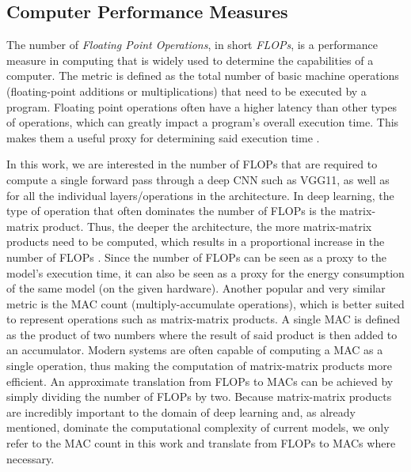 \subsection{Computer Performance Measures}
\label{sec:appendix-performance-measures}
The number of \emph{Floating Point Operations}, in short \emph{FLOPs}, is a performance measure in computing that is widely used to determine the capabilities of a computer. The metric is defined as the total number of basic machine operations (floating-point additions or multiplications) that need to be executed by a program. Floating point operations often have a higher latency than other types of operations, which can greatly impact a program's overall execution time. This makes them a useful proxy for determining said execution time \citep{Dissecting_DBLP:journals/corr/abs-2107-11949}.

In this work, we are interested in the number of FLOPs that are required to compute a single forward pass through a deep CNN such as VGG11, as well as for all the individual layers/operations in the architecture. In deep learning, the type of operation that often dominates the number of FLOPs is the matrix-matrix product. Thus, the deeper the architecture, the more matrix-matrix products need to be computed, which results in a proportional increase in the number of FLOPs \citep{Dissecting_DBLP:journals/corr/abs-2107-11949}. Since the number of FLOPs can be seen as a proxy to the model's execution time, it can also be seen as a proxy for the energy consumption of the same model (on the given hardware)\citep{Energy-based_DBLP:journals/corr/abs-1808-00286}. Another popular and very similar metric is the MAC count (multiply-accumulate operations), which is better suited to represent operations such as matrix-matrix products. A single MAC is defined as the product of two numbers where the result of said product is then added to an accumulator. Modern systems are often capable of computing a MAC as a single operation, thus making the computation of matrix-matrix products more efficient. An approximate translation from FLOPs to MACs can be achieved by simply dividing the number of FLOPs by two. Because matrix-matrix products are incredibly important to the domain of deep learning and, as already mentioned, dominate the computational complexity of current models, we only refer to the MAC count in this work and translate from FLOPs to MACs where necessary.
